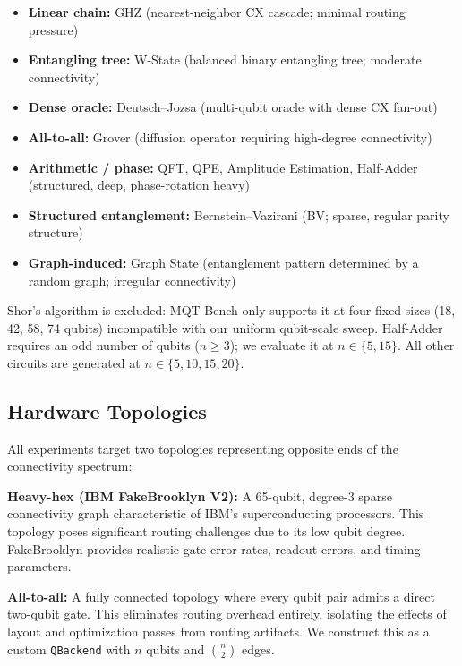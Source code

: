 \documentclass[conference]{IEEEtran}
\begin{document}
\begin{itemize}[nosep]
    \item \textbf{Linear chain:} GHZ (nearest-neighbor CX cascade; minimal routing pressure)
    \item \textbf{Entangling tree:} W-State (balanced binary entangling tree; moderate connectivity)
    \item \textbf{Dense oracle:} Deutsch--Jozsa (multi-qubit oracle with dense CX fan-out)
    \item \textbf{All-to-all:} Grover (diffusion operator requiring high-degree connectivity)
    \item \textbf{Arithmetic / phase:} QFT, QPE, Amplitude Estimation, Half-Adder (structured, deep, phase-rotation heavy)
    \item \textbf{Structured entanglement:} Bernstein--Vazirani (BV; sparse, regular parity structure)
    \item \textbf{Graph-induced:} Graph State (entanglement pattern determined by a random graph; irregular connectivity)
\end{itemize}

Shor's algorithm is excluded: MQT Bench only supports it at four fixed sizes (18, 42, 58, 74 qubits) incompatible with our uniform qubit-scale sweep.
Half-Adder requires an odd number of qubits ($n \geq 3$); we evaluate it at $n \in \{5, 15\}$.
All other circuits are generated at $n \in \{5, 10, 15, 20\}$.

\subsection{Hardware Topologies}
\label{subsec:topologies}

All experiments target two topologies representing opposite ends of the connectivity spectrum:

\textbf{Heavy-hex (IBM FakeBrooklyn V2):} A 65-qubit, degree-3 sparse connectivity graph characteristic of IBM's superconducting processors.
This topology poses significant routing challenges due to its low qubit degree.
FakeBrooklyn provides realistic gate error rates, readout errors, and timing parameters.

\textbf{All-to-all:} A fully connected topology where every qubit pair admits a direct two-qubit gate.
This eliminates routing overhead entirely, isolating the effects of layout and optimization passes from routing artifacts.
We construct this as a custom \texttt{QBackend} with $n$ qubits and $\binom{n}{2}$ edges.
\end{document}
